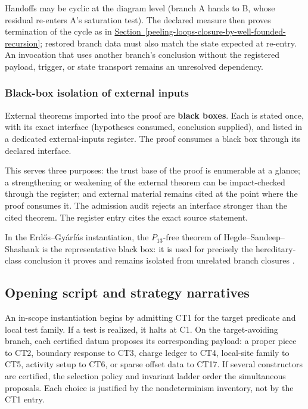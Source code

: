 \documentclass[
  11pt,
]{article}
\theoremstyle{definition}
\newcommand{\secref}[1]{\hyperref[#1]{Section~\ref*{#1}}}
\begin{document}
Handoffs may be cyclic at the diagram level (branch A hands to B, whose
residual re-enters A's saturation test). The declared measure then proves
termination of the cycle as in \secref{peeling-loops-closure-by-well-founded-recursion}; restored branch data
must also match the state expected at re-entry. An invocation that uses
another branch's conclusion without the registered payload, trigger, or
state transport remains an unresolved dependency.



\subsubsection{Black-box isolation of external
inputs}\label{black-box-isolation-of-external-inputs}

External theorems imported into the proof are \textbf{black boxes}. Each
is stated once, with its exact interface (hypotheses consumed,
conclusion supplied), and listed in a dedicated external-inputs
register. The proof consumes a black box through its declared interface.

This serves three purposes: the trust base of the proof is enumerable at
a glance; a strengthening or weakening of the external theorem can be
impact-checked through the register; and external material remains cited
at the point where the proof consumes it. The admission audit rejects an
interface stronger than the cited theorem. The register entry cites the
exact source statement.

In the Erdős--Gyárfás instantiation, the \(P_{13}\)-free theorem of
Hegde--Sandeep--Shashank is the representative black box: it is used for
precisely the hereditary-class conclusion it proves and remains isolated
from unrelated branch closures \citep{hegde-etal-2024-p13}.

\FloatBarrier
\clearpage

\subsection{Opening script and strategy narratives}\label{opening-script-and-strategy-narratives}

An in-scope instantiation begins by admitting CT1 for the target
predicate and local test family. If a test is realized, it halts at C1.
On the target-avoiding branch, each certified datum proposes its
corresponding payload: a proper piece to CT2, boundary response to CT3,
charge ledger to CT4, local-site family to CT5, activity setup to CT6,
or sparse offset data to CT17. If several constructors are certified,
the selection policy and invariant ladder order the simultaneous
proposals. Each choice is justified by the nondeterminism inventory, not
by the CT1 entry.
\end{document}
